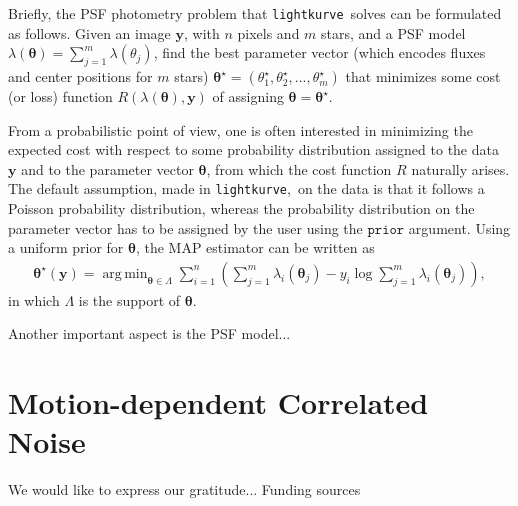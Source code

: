 \documentclass[twocolumn]{aastex62}
\newcommand{\lightkurve}{\texttt{lightkurve}}
\DeclareMathOperator*{\argmin}{arg\,min}
\begin{document}
Briefly, the PSF photometry problem that \lightkurve~solves can be formulated as
follows. Given an image $\bm{y}$, with $n$ pixels and $m$ stars, and a PSF model
$\lambda(\bm{\theta}) = \sum_{j=1}^{m} \lambda({\theta}_j)$,
find the best parameter vector (which encodes fluxes and center positions for $m$
stars) $\bm{\theta}^{\star} = (\theta_1^{\star}, \theta_2^{\star}, ..., \theta_m^{\star})$
that minimizes some cost (or loss) function $R(\lambda(\bm{\theta}), \bm{y})$
of assigning $\bm{\theta} = \bm{\theta}^{\star}$.

From a probabilistic point of view, one is often interested in minimizing the
expected cost with respect to some probability distribution assigned to the data
$\bm{y}$ and to the parameter vector $\bm{\theta}$, from which the cost function
$R$ naturally arises. The default assumption, made in \lightkurve,~on the data is
that it follows a Poisson probability distribution, whereas the probability
distribution on the parameter vector has to be assigned by the user using the $\texttt{prior}$
argument. Using a uniform prior for $\bm{\theta}$, the MAP estimator can be written
as
\begin{align}
    \bm{\theta}^{\star}(\bm{y}) = \argmin_{\bm{\theta} \in \Lambda} \sum_{i=1}^{n}
    \left(\sum_{j=1}^{m}\lambda_i(\bm{\theta}_j) - y_i\log\sum_{j=1}^{m}\lambda_i(\bm{\theta}_j)\right),
\end{align}
in which $\Lambda$ is the support of $\bm{\theta}$.

Another important aspect is the PSF model...

\section{Motion-dependent Correlated Noise}
\label{appendix:motion}

\acknowledgments

We would like to express our gratitude...
Funding sources

\vspace{5mm}





\end{document}
